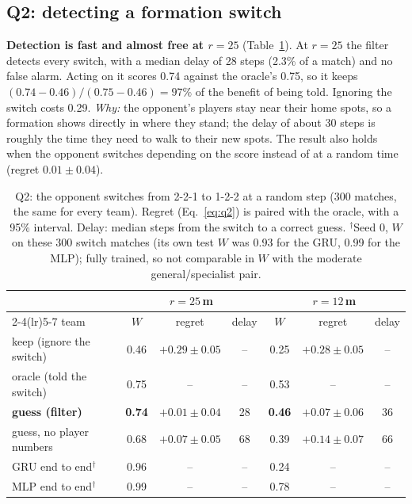 \documentclass{article}
\begin{document}
\subsection{Q2: detecting a formation switch}
\label{sec:q2}


\textbf{Detection is fast and almost free at $r=25$} (Table~\ref{tab:q2}). At $r=25$ the filter detects
every switch, with a median delay of 28 steps (2.3\% of a match) and no false alarm. Acting on it scores 0.74 against
the oracle's 0.75, so it keeps $(0.74-0.46)/(0.75-0.46)=97\%$ of the benefit of being told. Ignoring the switch costs
0.29. \emph{Why:} the opponent's players stay near their home spots, so a formation shows directly in where they stand;
the delay of about 30 steps is roughly the time they need to walk to their new spots. The result also holds when the
opponent switches depending on the score instead of at a random time (regret $0.01\pm0.04$).

\begin{table}[H]
\caption{Q2: the opponent switches from 2-2-1 to 1-2-2 at a random step (300 matches, the same for every team). Regret
(Eq.~\ref{eq:q2}) is paired with the oracle, with a 95\% interval. Delay: median steps from the switch to a correct
guess. $^\dagger$Seed 0, $W$ on these 300 switch matches (its own test $W$ was 0.93 for the GRU, 0.99 for the MLP); fully
trained, so not comparable in $W$ with the moderate general/specialist pair.}
\label{tab:q2}
\centering
\small
\begin{tabular}{lcccccc}
\toprule
 & \multicolumn{3}{c}{$r=25$\,m} & \multicolumn{3}{c}{$r=12$\,m} \\
\cmidrule(lr){2-4}\cmidrule(lr){5-7}
team & $W$ & regret & delay & $W$ & regret & delay \\
\midrule
keep (ignore the switch) & 0.46 & $+0.29\pm0.05$ & -- & 0.25 & $+0.28\pm0.05$ & -- \\
oracle (told the switch) & 0.75 & -- & -- & 0.53 & -- & -- \\
\textbf{guess (filter)} & \textbf{0.74} & $\mathbf{+0.01\pm0.04}$ & 28 & \textbf{0.46} & $+0.07\pm0.06$ & 36 \\
guess, no player numbers & 0.68 & $+0.07\pm0.05$ & 68 & 0.39 & $+0.14\pm0.07$ & 66 \\
\midrule
GRU end to end$^\dagger$ & 0.96 & -- & -- & 0.24 & -- & -- \\
MLP end to end$^\dagger$ & 0.99 & -- & -- & 0.78 & -- & -- \\
\bottomrule
\end{tabular}
\end{table}
\end{document}
